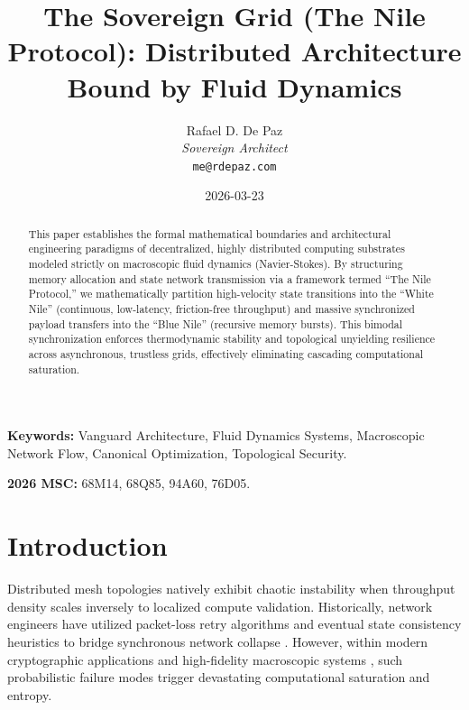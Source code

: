 \documentclass[12pt, a4paper]{article}
\theoremstyle{plain}
\theoremstyle{definition}
\begin{document}
\title{\textbf{
  The Sovereign Grid (The Nile Protocol): Distributed Architecture Bound by Fluid Dynamics}}
\author{Rafael D. De Paz \\ \textit{Sovereign Architect} \\ \texttt{me@rdepaz.com}}
\date{2026-03-23}
\maketitle

\begin{abstract}
This paper establishes the formal mathematical boundaries and architectural engineering paradigms of decentralized, highly distributed computing substrates modeled strictly on macroscopic fluid dynamics (Navier-Stokes). By structuring memory allocation and state network transmission via a framework termed ``The Nile Protocol,'' we mathematically partition high-velocity state transitions into the ``White Nile'' (continuous, low-latency, friction-free throughput) and massive synchronized payload transfers into the ``Blue Nile'' (recursive memory bursts). This bimodal synchronization enforces thermodynamic stability and topological unyielding resilience across asynchronous, trustless grids, effectively eliminating cascading computational saturation.
\end{abstract}

\vspace{1em}
\noindent\textbf{Keywords:} Vanguard Architecture, Fluid Dynamics Systems, Macroscopic Network Flow, Canonical Optimization, Topological Security.

\vspace{0.5em}
\noindent\textbf{2026 MSC:} 68M14, 68Q85, 94A60, 76D05.

\section{Introduction}

Distributed mesh topologies natively exhibit chaotic instability when throughput density scales inversely to localized compute validation. Historically, network engineers have utilized packet-loss retry algorithms and eventual state consistency heuristics to bridge synchronous network collapse \cite{shannon1948mathematical}. However, within modern cryptographic applications and high-fidelity macroscopic systems \cite{awerbuch1992macroscopic}, such probabilistic failure modes trigger devastating computational saturation and entropy.
\end{document}

